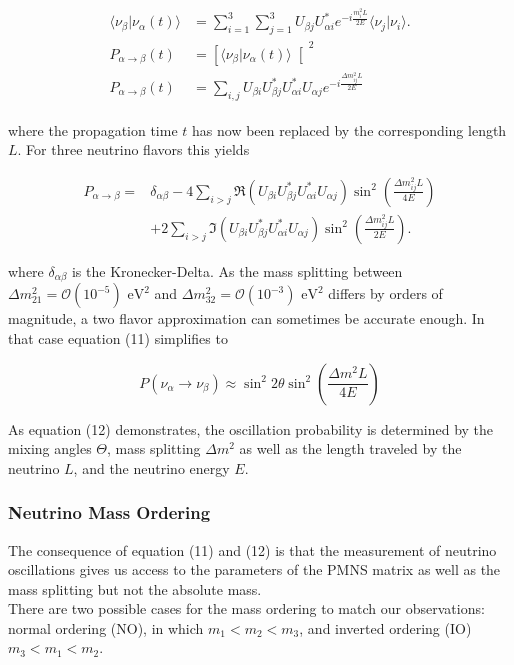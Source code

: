 \documentclass[a4paper,12pt,numbered]{article}
\begin{document}
\begin{align}
\begin{split}
\langle \nu_\beta | \nu_\alpha (t) \rangle &= \sum_{i=1}^3 \sum_{j=1}^3 U_{\beta j} U_{\alpha i}^* e^{-i \frac{m_i^2 L}{2E}} \langle \nu_j | \nu_i \rangle.
\\
P_{\alpha \to \beta}(t) &= \left[ \langle \nu_\beta | \nu_\alpha (t) \rangle \right[^2
\\
P_{\alpha \to \beta}(t) &= \sum_{i,j} U_{\beta i} U_{\beta j}^* U_{\alpha i}^* U_{\alpha j} e^{-i \frac{\Delta m_{ij}^2 L}{2E}}
\end{split}
\end{align}

where the propagation time $t$ has now been replaced by the corresponding length $L$.
For three neutrino flavors this yields

\begin{align}
P_{\alpha \to \beta} = & \delta_{\alpha\beta} - 4 \sum_{i > j} \Re\left( U_{\beta i} U_{\beta j}^* U_{\alpha i}^* U_{\alpha j} \right) \sin^2\left( \frac{\Delta m_{ij}^2 L}{4E} \right) \nonumber \\
& + 2 \sum_{i > j} \Im\left( U_{\beta i} U_{\beta j}^* U_{\alpha i}^* U_{\alpha j} \right) \sin^2\left( \frac{\Delta m_{ij}^2 L}{2E} \right).
\end{align}

where $\delta_{\alpha\beta}$ is the Kronecker-Delta. As the mass splitting between $\Delta m_{21}^2=\mathcal{O}(10^{-5}) \text{ eV}^2$ and $\Delta m_{32}^2=\mathcal{O}(10^{-3}) \text{ eV}^2$ differs by orders of magnitude, a two flavor approximation can sometimes be accurate enough. In that case equation (11) simplifies to

\begin{equation}
P(\nu_\alpha \to \nu_\beta) \approx \sin^2 2\theta \sin^2 \left(\frac{\Delta m^2 L}{4E}\right)
\end{equation}

As equation (12) demonstrates, the oscillation probability is determined by the mixing angles $\Theta$, mass splitting $\Delta m^2$ as well as the length traveled by the neutrino $L$, and the neutrino energy $E$. 

\subsubsection{Neutrino Mass Ordering}

The consequence of equation (11) and (12) is that the measurement of neutrino oscillations gives us access to the parameters of the PMNS matrix as well as the mass splitting but not the absolute mass.
\\ 
There are two possible cases for the mass ordering to match our observations: normal ordering (NO), in which $m_1 < m_2 < m_3$, and inverted ordering (IO) $m_3 < m_1 < m_2$. 
\end{document}
